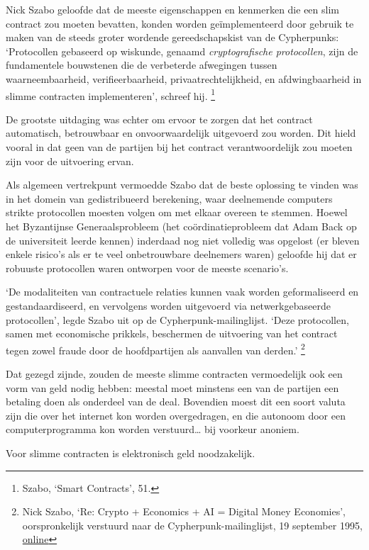 \documentclass[
  a5paper,
  smalldemyvopaper,11pt,twoside,onecolumn,openright,extrafontsizes]{memoir}
\begin{document}
Nick Szabo geloofde dat de meeste eigenschappen en kenmerken die een
slim contract zou moeten bevatten, konden worden geïmplementeerd door
gebruik te maken van de steeds groter wordende gereedschapskist van de
Cypherpunks: `Protocollen gebaseerd op wiskunde, genaamd
\emph{cryptografische protocollen}, zijn de fundamentele bouwstenen die
de verbeterde afwegingen tussen waarneembaarheid, verifieerbaarheid,
privaatrechtelijkheid, en afdwingbaarheid in slimme contracten
implementeren', schreef hij. \footnote{Szabo, `Smart Contracts', 51.}

De grootste uitdaging was echter om ervoor te zorgen dat het contract
automatisch, betrouwbaar en onvoorwaardelijk uitgevoerd zou worden. Dit
hield vooral in dat geen van de partijen bij het contract
verantwoordelijk zou moeten zijn voor de uitvoering ervan.

Als algemeen vertrekpunt vermoedde Szabo dat de beste oplossing te
vinden was in het domein van gedistribueerd berekening, waar deelnemende
computers strikte protocollen moesten volgen om met elkaar overeen te
stemmen. Hoewel het Byzantijnse Generaalsprobleem (het
coördinatieprobleem dat Adam Back op de universiteit leerde kennen)
inderdaad nog niet volledig was opgelost (er bleven enkele risico's als
er te veel onbetrouwbare deelnemers waren) geloofde hij dat er robuuste
protocollen waren ontworpen voor de meeste scenario's.

`De modaliteiten van contractuele relaties kunnen vaak worden
geformaliseerd en gestandaardiseerd, en vervolgens worden uitgevoerd via
netwerkgebaseerde protocollen', legde Szabo uit op de
Cypherpunk-mailinglijst. `Deze protocollen, samen met economische
prikkels, beschermen de uitvoering van het contract tegen zowel fraude
door de hoofdpartijen als aanvallen van derden.' \footnote{Nick Szabo,
  `Re: Crypto + Economics + AI = Digital Money Economies',
  oorspronkelijk verstuurd naar de Cypherpunk-mailinglijst, 19 september
  1995,
  \href{https://cypherpunks.venona.com/date/1995/09/msg01303.html}{online}}

Dat gezegd zijnde, zouden de meeste slimme contracten vermoedelijk ook
een vorm van geld nodig hebben: meestal moet minstens een van de
partijen een betaling doen als onderdeel van de deal. Bovendien moest
dit een soort valuta zijn die over het internet kon worden overgedragen,
en die autonoom door een computerprogramma kon worden verstuurd\ldots{}
bij voorkeur anoniem.

Voor slimme contracten is elektronisch geld noodzakelijk.
\end{document}
